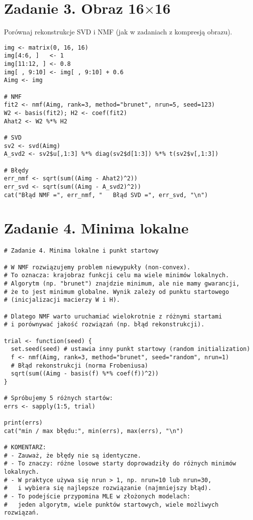 \documentclass[12pt]{article}
\begin{document}
\section*{Zadanie 3. Obraz 16$\times$16}
Porównaj rekonstrukcje SVD i NMF (jak w zadaniach z kompresją obrazu).
\begin{lstlisting}
img <- matrix(0, 16, 16)
img[4:6, ]   <- 1
img[11:12, ] <- 0.8
img[ , 9:10] <- img[ , 9:10] + 0.6
Aimg <- img

# NMF
fit2 <- nmf(Aimg, rank=3, method="brunet", nrun=5, seed=123)
W2 <- basis(fit2); H2 <- coef(fit2)
Ahat2 <- W2 %*% H2

# SVD
sv2 <- svd(Aimg)
A_svd2 <- sv2$u[,1:3] %*% diag(sv2$d[1:3]) %*% t(sv2$v[,1:3])

# Błędy
err_nmf <- sqrt(sum((Aimg - Ahat2)^2))
err_svd <- sqrt(sum((Aimg - A_svd2)^2))
cat("Błąd NMF =", err_nmf, "   Błąd SVD =", err_svd, "\n")
\end{lstlisting}

\section*{Zadanie 4. Minima lokalne}
\begin{lstlisting}
# Zadanie 4. Minima lokalne i punkt startowy

# W NMF rozwiązujemy problem niewypukły (non-convex).
# To oznacza: krajobraz funkcji celu ma wiele minimów lokalnych.
# Algorytm (np. "brunet") znajdzie minimum, ale nie mamy gwarancji,
# że to jest minimum globalne. Wynik zależy od punktu startowego
# (inicjalizacji macierzy W i H).

# Dlatego NMF warto uruchamiać wielokrotnie z różnymi startami
# i porównywać jakość rozwiązań (np. błąd rekonstrukcji).

trial <- function(seed) {
  set.seed(seed) # ustawia inny punkt startowy (random initialization)
  f <- nmf(Aimg, rank=3, method="brunet", seed="random", nrun=1)
  # Błąd rekonstrukcji (norma Frobeniusa)
  sqrt(sum((Aimg - basis(f) %*% coef(f))^2))
}

# Spróbujemy 5 różnych startów:
errs <- sapply(1:5, trial)

print(errs)
cat("min / max błędu:", min(errs), max(errs), "\n")

# KOMENTARZ:
# - Zauważ, że błędy nie są identyczne.
# - To znaczy: różne losowe starty doprowadziły do różnych minimów lokalnych.
# - W praktyce używa się nrun > 1, np. nrun=10 lub nrun=30,
#   i wybiera się najlepsze rozwiązanie (najmniejszy błąd).
# - To podejście przypomina MLE w złożonych modelach:
#   jeden algorytm, wiele punktów startowych, wiele możliwych rozwiązań.

\end{lstlisting}
\end{document}
